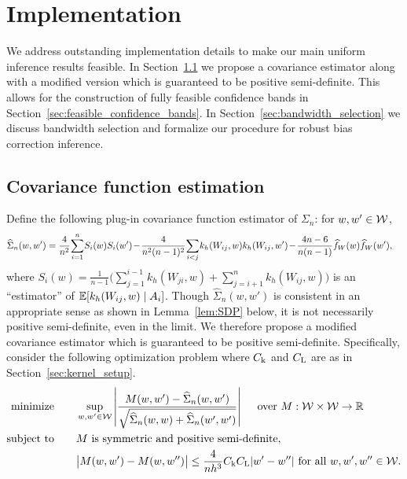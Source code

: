 \section{Implementation}\label{sec:implementation}

We address outstanding implementation details to make our main
uniform inference results feasible.
In Section~\ref{sec:covariance_estimation} we propose a covariance estimator
along with a modified version which is guaranteed to be positive semi-definite.
This allows for the construction of fully feasible confidence bands
in Section~\ref{sec:feasible_confidence_bands}.
In Section~\ref{sec:bandwidth_selection} we discuss bandwidth selection
and formalize our procedure for
robust bias correction inference.

\subsection{Covariance function estimation}
\label{sec:covariance_estimation}

Define the following plug-in covariance function
estimator of $\Sigma_n$: for $w, w' \in \mathcal{W}$,
%
\begin{align*}
  \widehat \Sigma_n(w,w')
  &=
  \frac{4}{n^2}
  \hspace*{-0.5mm}
  \sum_{i=1}^n
  \hspace*{-0.5mm}
  S_i(w) S_i(w')
  \hspace*{-0.5mm}
  -
  \hspace*{-0.5mm}
  \frac{4}{n^2(n-1)^2}
  \hspace*{-0.5mm}
  \sum_{i<j}
  \hspace*{-0.5mm}
  k_h(W_{ij},w)
  k_h(W_{ij},w')
  \hspace*{-0.5mm}
  -
  \hspace*{-0.5mm}
  \frac{4n-6}{n(n-1)}
  \widehat f_W(w)
  \widehat f_W(w'),
\end{align*}
%
where
$S_i(w) = \frac{1}{n-1} \big( \sum_{j = 1}^{i-1} k_h(W_{j i}, w)
+ \sum_{j = i+1}^n k_h(W_{ij}, w) \big)$
is an ``estimator'' of
$\mathbb{E}[k_h(W_{ij},w) \mid A_i]$.
Though $\widehat\Sigma_n(w,w')$ is consistent in an appropriate sense
as shown in Lemma~\ref{lem:SDP} below,
it is not necessarily positive semi-definite,
even in the limit.
We therefore propose a modified covariance estimator
which is guaranteed to be positive semi-definite.
Specifically, consider the following optimization problem
where $C_\mathrm{k}$ and $C_\mathrm{L}$ are as in Section~\ref{sec:kernel_setup}.
%
\begin{equation}
  \label{eq:SDP}
  \begin{aligned}
    \operatorname*{minimize}
    \qquad
     & \sup_{w,w' \in \mathcal{W}}
    \left|
    \frac{M(w,w') - \widehat\Sigma_n(w,w')}
    {\sqrt{\widehat \Sigma_n(w,w) + \widehat \Sigma_n(w',w')}}
    \right|
    \quad \textup{ over } M: \mathcal{W} \times \mathcal{W} \to \mathbb{R}
    \\
    \operatorname*{subject\ to}
    \qquad
     & M \textup{ is symmetric and positive semi-definite}, \\
     & \big|M(w,w') - M(w, w'')\big|
    \leq \frac{4}{n h^3}
    C_\mathrm{k} C_\mathrm{L}
    |w'-w''|
    \textup{ for all }
    w, w', w'' \in \mathcal{W}.
  \end{aligned}
\end{equation}

